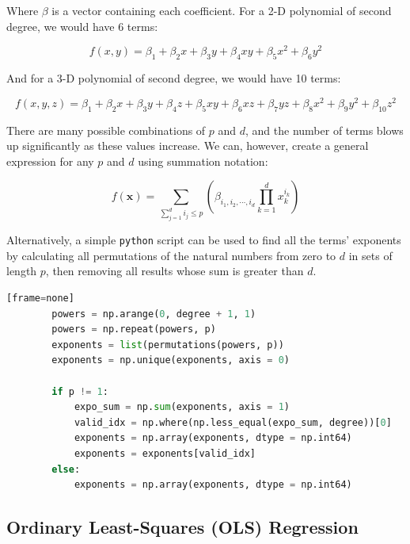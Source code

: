 \documentclass[a4paper,10pt,english]{article}
\begin{document}
	Where $\beta$ is a vector containing each coefficient.	For a 2-D polynomial of second degree, we would have 6 terms:
	
	\begin{equation*}
	f(x,y) = \beta_1 + \beta_2 x + \beta_3 y + \beta_4 xy + \beta_5 x^2 + \beta_6 y^2
	\end{equation*}
	
	And for a 3-D polynomial of second degree, we would have 10 terms:
	
	\begin{equation*}
	f(x,y,z) = \beta_1 + \beta_2 x + \beta_3 y + \beta_4 z + \beta_5 xy + \beta_6 xz + \beta_7 yz + \beta_8 x^2 + \beta_9 y^2 + \beta_{10} z^2
	\end{equation*}
	
	There are many possible combinations of $p$ and $d$, and the number of terms blows up significantly as these values increase.  We can, however, create a general expression \cite{2482654} for any $p$ and $d$ using summation notation:
	
	\begin{equation}
	\label{eq_method_0}
	f(\mathbf{x}) = \sum_{\sum_{j = 1}^d i_j \leq p} \left( \beta_{i_1, i_2, \cdots, i_d} \prod_{k = 1}^d x_k^{i_k} \right)
	\end{equation}
	
	Alternatively, a simple \texttt{python} script can be used to find all the terms' exponents by calculating all permutations of the natural numbers from zero to $d$ in sets of length $p$, then removing all results whose sum is greater than $d$.
	
	\begin{lstlisting}[showstringspaces=false,language=Python,firstnumber = 1][frame=none]
        powers = np.arange(0, degree + 1, 1)
        powers = np.repeat(powers, p)
        exponents = list(permutations(powers, p))
        exponents = np.unique(exponents, axis = 0)

        if p != 1:
            expo_sum = np.sum(exponents, axis = 1)
            valid_idx = np.where(np.less_equal(expo_sum, degree))[0]
            exponents = np.array(exponents, dtype = np.int64)
            exponents = exponents[valid_idx]
        else:
            exponents = np.array(exponents, dtype = np.int64)
	\end{lstlisting}

	\subsection*{Ordinary Least-Squares (OLS) Regression}
	
\end{document}
